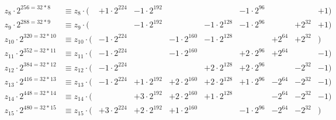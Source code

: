 \begin{align*}
z_8\cdot 2^{256=32*8} &\equiv z_8\cdot (&+1\cdot 2^{224} &-1\cdot 2^{192}&&& -1\cdot 2^{96} &&&+ 1) \\
z_9\cdot 2^{288=32*9} &\equiv z_9\cdot (&&-1\cdot 2^{192}&& -1\cdot 2^{128} &-1\cdot 2^{96} &&+ 2^{32} &+ 1) \\
z_{10}\cdot 2^{320=32*10} &\equiv z_{10}\cdot (&- 1\cdot 2^{224}&& -1\cdot 2^{160} &-1\cdot 2^{128} &&+ 2^{64} &+ 2^{32}&) \\
z_{11}\cdot 2^{352=32*11} &\equiv z_{11}\cdot (&- 1\cdot 2^{224}&& -1\cdot 2^{160}&& + 2\cdot 2^{96} &+ 2^{64} &&- 1) \\
z_{12}\cdot 2^{384=32*12} &\equiv z_{12}\cdot (&- 1\cdot 2^{224}&&& + 2\cdot 2^{128} &+ 2\cdot 2^{96} &&- 2^{32} &- 1) \\
z_{13}\cdot 2^{416=32*13} &\equiv z_{13}\cdot (&- 1\cdot 2^{224} &+1\cdot 2^{192} &+ 2\cdot 2^{160} &+ 2\cdot 2^{128} &+1\cdot 2^{96} &- 2^{64} &- 2^{32} &- 1) \\
z_{14}\cdot 2^{448=32*14} &\equiv z_{14}\cdot (&&+3\cdot 2^{192} &+ 2\cdot 2^{160} &+1\cdot 2^{128} &&- 2^{64} &- 2^{32} &- 1) \\
z_{15}\cdot 2^{480=32*15} &\equiv z_{15}\cdot (&+3\cdot 2^{224} &+ 2\cdot 2^{192} &+1\cdot 2^{160} &&-1\cdot 2^{96} &- 2^{64} &- 2^{32}&)
\end{align*}
